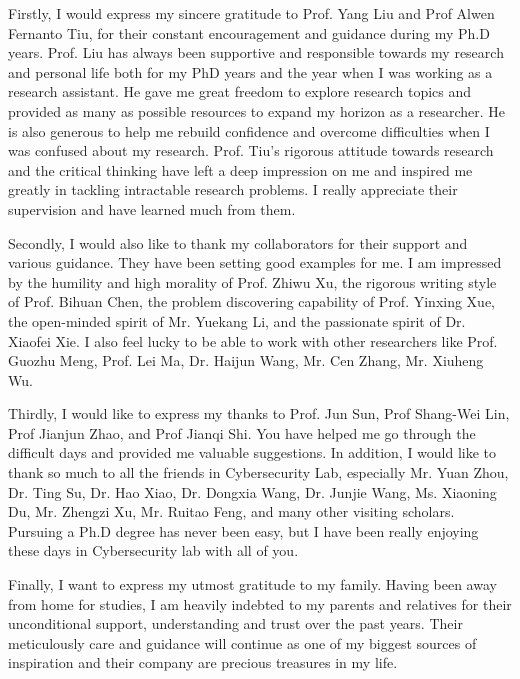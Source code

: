 
Firstly, I would express my sincere gratitude to Prof. Yang Liu and Prof Alwen Fernanto Tiu, for their constant encouragement and guidance during my Ph.D years. Prof. Liu has always been supportive and responsible towards my research and personal life both for my PhD years and the year when I was working as a research assistant. He gave me great freedom to explore research topics and provided as many as possible resources to expand my horizon as a researcher. He is also generous to help me rebuild confidence and overcome difficulties when I was confused about my research. Prof. Tiu's rigorous attitude towards research and the critical thinking have left a deep impression on me and inspired me greatly in tackling intractable research problems. I really appreciate their supervision and have learned much from them.

Secondly, I would also like to thank my collaborators for their support and various guidance. They have been setting good examples for me. I am impressed by the humility and high morality of Prof. Zhiwu Xu, the rigorous writing style of Prof. Bihuan Chen, the problem discovering capability of Prof. Yinxing Xue, the open-minded spirit of Mr. Yuekang Li, and the passionate spirit of Dr. Xiaofei Xie. I also feel lucky to be able to work with other researchers like Prof. Guozhu Meng, Prof. Lei Ma, Dr. Haijun Wang, Mr. Cen Zhang, Mr. Xiuheng Wu.

Thirdly, I would like to express my thanks to Prof. Jun Sun, Prof Shang-Wei Lin, Prof Jianjun Zhao, and Prof Jianqi Shi. You have helped me go through the difficult days and provided me valuable suggestions. In addition, I would like to thank so much to all the friends in Cybersecurity Lab, especially Mr. Yuan Zhou, Dr. Ting Su, Dr. Hao Xiao, Dr. Dongxia Wang, Dr. Junjie Wang, Ms. Xiaoning Du, Mr. Zhengzi Xu, Mr. Ruitao Feng, and many other visiting scholars. Pursuing a Ph.D degree has never been easy, but I have been really enjoying these days in Cybersecurity lab with all of you.

Finally, I want to express my utmost gratitude to my family. Having been away from home for studies, I am heavily indebted to my parents and relatives for their unconditional support, understanding and trust over the past years. Their meticulously care and guidance will continue as one of my biggest sources of inspiration and their company are precious treasures in my life.